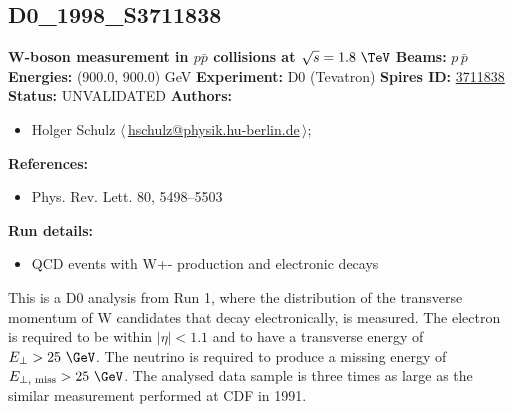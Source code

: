 \subsection[D0\_1998\_S3711838]{D0\_1998\_S3711838\,\cite{Abbott:1998jy}}
\textbf{W-boson \pT measurement in $p\bar{p}$ collisions at $\sqrt{s}=1.8~\TeV$}\newline
\textbf{Beams:} $p$\,$\bar{p}$ \newline
\textbf{Energies:} (900.0, 900.0) GeV \newline
\textbf{Experiment:} D0 (Tevatron) \newline
\textbf{Spires ID:} \href{http://www.slac.stanford.edu/spires/find/hep/www?rawcmd=key+3711838}{3711838}\newline
\textbf{Status:} UNVALIDATED\newline
\textbf{Authors:}
\begin{itemize}
  \item Holger Schulz $\langle\,$\href{mailto:hschulz@physik.hu-berlin.de}{hschulz@physik.hu-berlin.de}$\,\rangle$;
\end{itemize}
\textbf{References:}
\begin{itemize}
  \item Phys. Rev. Lett. 80, 5498–5503
\end{itemize}
\textbf{Run details:}
\begin{itemize}

  \item QCD events with W+- production and electronic decays\end{itemize}

\noindent This is a D0 analysis from Run 1, where the distribution of the transverse momentum of W candidates that decay  electronically, is measured. The electron is required to be within $\left|\eta\right| < 1.1$ and to have a transverse energy of $E_\perp > 25~\GeV$.  The neutrino is required to produce a missing energy of $E_{\perp, \text{ miss}}>25~\GeV$. The analysed data sample is three times as large as the similar measurement performed at CDF in 1991.

\clearpage


\clearpage

